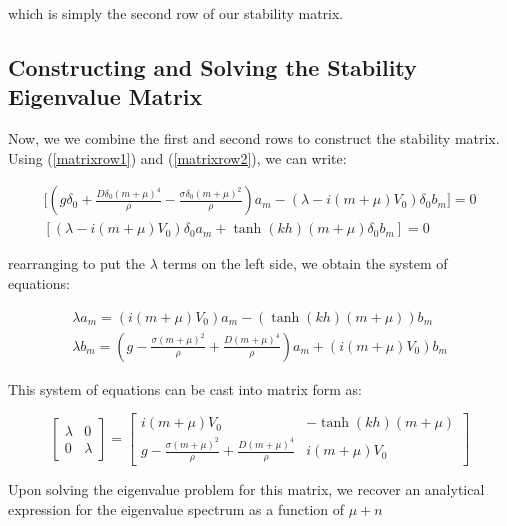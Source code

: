 \documentclass{article}
\begin{document}
\vspace{15} 

which is simply the second row of our stability matrix.

\subsection{Constructing and Solving the Stability Eigenvalue Matrix}

Now, we we combine the first and second rows to construct the stability matrix. Using (\ref{matrixrow1}) and (\ref{matrixrow2}), we can write: 


\begin{align} \label{matrix}
  \bigg[(g\delta_{0} + \frac{D\delta_{0}(m+\mu)^4}{\rho} - \frac{\sigma \delta_{0} (m+\mu)^2}{\rho})a_{m} - (\lambda - i(m+\mu)V_{0})\delta_{0}b_{m}\bigg] = 0 
  \\
  [(\lambda - i(m+\mu)V_{0})\delta_{0}a_{m} + \tanh(kh)(m+\mu)\delta_{0}b_{m} ] = 0 
\end{align}

rearranging to put the \( \lambda \) terms on the left side, we obtain the system of equations:



\begin{align} \label{matrix2}
  \lambda a_{m} =  (i(m+\mu)V_{0})a_{m} - (\tanh(kh)(m+\mu))b_{m} 
  \\
  \lambda b_{m} =  (g - \frac{\sigma(m+\mu)^2}{\rho} + \frac{D(m+\mu)^4}{\rho})a_m + (i(m+\mu)V_{0})b_{m} 
\end{align}

This system of equations can be cast into matrix form as: 

\begin{equation}
    \begin{bmatrix} \label{stabilitymatrix}
    \lambda & 0\\
    0 & \lambda 
    \end{bmatrix}
    = 
    \begin{bmatrix} \label{stabilitymatrix}
    i(m+\mu)V_{0} & -\tanh(kh)(m+\mu)\\
    g - \frac{\sigma(m+\mu)^2}{\rho} + \frac{D(m+\mu)^4}{\rho} & i(m+\mu)V_{0} 
    \end{bmatrix}
\end{equation}

\vspace{10} 

Upon solving the eigenvalue problem for this matrix, we recover an analytical expression for the eigenvalue spectrum as a function of \(\mu+n\) 
\end{document}
